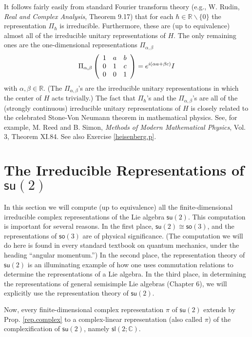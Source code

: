 \documentclass{amsbook}
\theoremstyle{plain}
\numberwithin{equation}{chapter}
\numberwithin{theorem}{chapter}
\begin{document}
It follows fairly easily from standard Fourier transform theory (e.g., W.
Rudin, \textit{Real and Complex Analysis}, Theorem 9.17) that for each
$\hbar\in\mathbb{R}\backslash\{0\}$ the representation $\Pi_{\hbar}$ is
irreducible. Furthermore, these are (up to equivalence) almost all of the
irreducible unitary representations of $H$. The only remaining ones are the
one-dimensional representations $\Pi_{\alpha,\beta}$%
\[
\Pi_{\alpha,\beta}\left(
\begin{array}
[c]{ccc}%
1 & a & b\\
0 & 1 & c\\
0 & 0 & 1
\end{array}
\right)  =e^{i(\alpha a+\beta c)}I
\]
with $\alpha,\beta\in\mathbb{R}$. (The $\Pi_{\alpha,\beta}$'s are the
irreducible unitary representations in which the center of $H$ acts
trivially.) The fact that $\Pi_{\hbar}$'s and the $\Pi_{\alpha,\beta}$'s are
all of the (strongly continuous) irreducible unitary representations of $H$ is
closely related to the celebrated Stone-Von Neumann theorem in mathematical
physics. See, for example, M. Reed and B. Simon, \textit{Methods of Modern
Mathematical Physics}, Vol. 3, Theorem XI.84. See also Exercise
\ref{heisenberg.p}.

\section{The Irreducible Representations of $\mathsf{su}(2)$}

In this section we will compute (up to equivalence) all the finite-dimensional
irreducible complex representations of the Lie algebra $\mathsf{su}(2)$. This
computation is important for several reasons. In the first place,
$\mathsf{su}(2)\cong\mathsf{so}(3)$, and the representations of $\mathsf{so}%
(3)$ are of physical significance. (The computation we will do here is found
in every standard textbook on quantum mechanics, under the heading ``angular
momentum.'') In the second place, the representation theory of $\mathsf{su}%
(2)$ is an illuminating example of how one uses commutation relations to
determine the representations of a Lie algebra. In the third place, in
determining the representations of general semisimple Lie algebras (Chapter
6), we will explicitly use the representation theory of $\mathsf{su}(2)$.

Now, every finite-dimensional complex representation $\pi$ of $\mathsf{su}(2)$
extends by Prop. \ref{rep.complex} to a complex-linear representation (also
called $\pi$) of the complexification of $\mathsf{su}(2)$, namely
$\mathsf{sl}(2;\mathbb{C})$.
\end{document}
